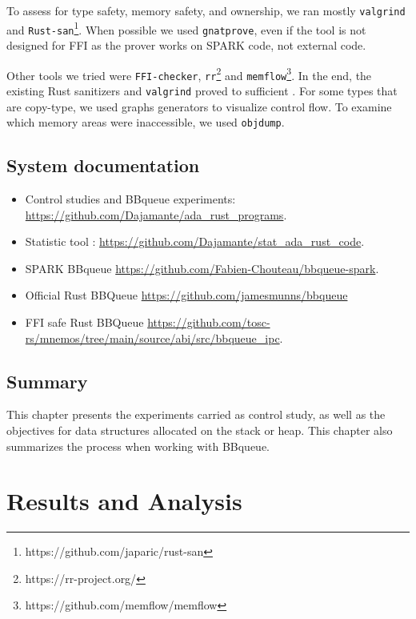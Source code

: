 \documentclass[nomenclature, english, bibtex]{kththesis}
\begin{document}
To assess for type safety, memory safety, and ownership, we ran mostly \texttt{valgrind} and \texttt{Rust-san}\footnote{https://github.com/japaric/rust-san}.
When possible we used \texttt{gnatprove}, even if the tool is not designed for FFI as the prover works on SPARK code, not external code.

Other tools we tried were \texttt{FFI-checker}\cite{li_detecting_2022}, \texttt{rr}\footnote{https://rr-project.org/} and \texttt{memflow}\footnote{https://github.com/memflow/memflow}. In the end, the existing Rust sanitizers and \texttt{valgrind} proved to sufficient .
For some types that are \gls{copy-type}, we used graphs generators to visualize control flow. To examine which memory areas were inaccessible, we used \texttt{objdump}.


\section{System documentation}
\label{sec:systemDocumentation}

\begin{itemize}
    \item Control studies and BBqueue experiments: 
        \url{https://github.com/Dajamante/ada_rust_programs}.
    \item Statistic tool : 
        \url{https://github.com/Dajamante/stat_ada_rust_code}.
    \item SPARK BBqueue 
        \url{https://github.com/Fabien-Chouteau/bbqueue-spark}.
    \item Official Rust BBQueue 
        \url{https://github.com/jamesmunns/bbqueue}
    \item FFI safe Rust BBQueue
        \url{https://github.com/tosc-rs/mnemos/tree/main/source/abi/src/bbqueue_ipc}.
\end{itemize}

\section{Summary}

This chapter presents the experiments carried as control study, as well as the objectives for data structures allocated on the stack or heap. This chapter also summarizes the process when working with BBqueue.

\cleardoublepage
\chapter{Results and Analysis}
\label{ch:resultsAndAnalysis}
\end{document}

